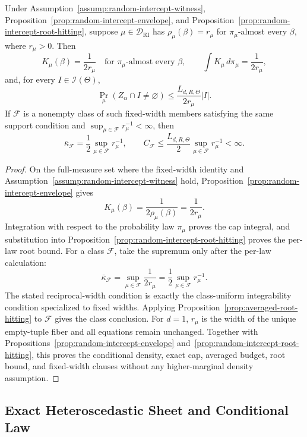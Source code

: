 \begin{proposition}
\label{prop:fixed-width}
Under Assumption~\ref{assump:random-intercept-witness},
Proposition~\ref{prop:random-intercept-envelope}, and
Proposition~\ref{prop:random-intercept-root-hitting}, suppose
$\mu\in\mathcal D_{\mathrm{RI}}$ has
$\rho_\mu(\beta)=r_\mu$ for $\pi_\mu$-almost every $\beta$, where
$r_\mu>0$.  Then
\[
K_\mu(\beta)=\frac{1}{2r_\mu}
\quad\text{for }\pi_\mu\text{-almost every }\beta,
\qquad
\int K_\mu\,d\pi_\mu=\frac{1}{2r_\mu},
\]
and, for every $I\in\mathscr I(\Theta)$,
\[
\Pr_\mu(Z_\alpha\cap I\neq\varnothing)
\leq\frac{L_{d,R,\Theta}}{2r_\mu}|I|.
\]
If $\mathcal F$ is a nonempty class of such fixed-width members satisfying
the same support condition and
$\sup_{\mu\in\mathcal F}r_\mu^{-1}<\infty$, then
\[
\bar\kappa_{\mathcal F}
=\frac12\sup_{\mu\in\mathcal F}r_\mu^{-1},
\qquad
C_{\mathcal F}
\leq\frac{L_{d,R,\Theta}}2
       \sup_{\mu\in\mathcal F}r_\mu^{-1}<\infty.
\]
\end{proposition}

\begin{proof}
On the full-measure set where the fixed-width identity and
Assumption~\ref{assump:random-intercept-witness} hold,
Proposition~\ref{prop:random-intercept-envelope} gives
\[
K_\mu(\beta)=\frac{1}{2\rho_\mu(\beta)}
=\frac{1}{2r_\mu}.
\]
Integration with respect to the probability law $\pi_\mu$ proves the
cap integral, and substitution into
Proposition~\ref{prop:random-intercept-root-hitting} proves the per-law
root bound.  For a class $\mathcal F$, take the supremum only after the
per-law calculation:
\[
\bar\kappa_{\mathcal F}
=\sup_{\mu\in\mathcal F}\frac{1}{2r_\mu}
=\frac12\sup_{\mu\in\mathcal F}r_\mu^{-1}.
\]
The stated reciprocal-width condition is exactly the class-uniform
integrability condition specialized to fixed widths.  Applying
Proposition~\ref{prop:averaged-root-hitting} to $\mathcal F$ gives the
class conclusion.  For $d=1$, $r_\mu$ is the width of the unique
empty-tuple fiber and all equations remain unchanged.  Together with
Propositions~\ref{prop:random-intercept-envelope}
and~\ref{prop:random-intercept-root-hitting}, this proves the conditional
density, exact cap, averaged budget, root bound, and fixed-width clauses
without any higher-marginal density assumption.
\end{proof}

\subsection{Exact Heteroscedastic Sheet and Conditional Law}
\label{app:heteroscedastic-sheet}

